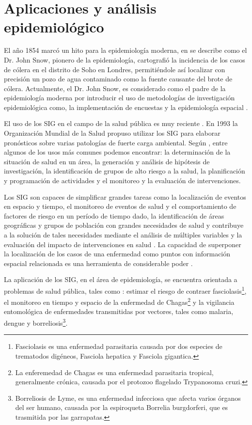 \section{Aplicaciones y análisis epidemiológico}
\label{sec:cap2-aplicaciones-analisis-epidemiologico}

El año 1854 marcó un hito para la epidemiología moderna, en \cite{jCerdaJohnSnow2007} se describe
como el Dr. John Snow, pionero de la epidemiología, cartografió la incidencia de los casos de
cólera en el distrito de Soho en Londres, permitiéndole así localizar con precisión un pozo de
agua contaminado como la fuente causante del brote de cólera. Actualmente, el Dr. John Snow, es
considerado como el padre de la epidemiología moderna por introducir el uso de  metodologías de
investigación epidemiológica como, la implementación de encuestas y la epidemiología espacial
\cite{jCerdaJohnSnow2007}.

El uso de los SIG en el campo de la salud pública es muy reciente \cite{martinez2001sigepi}. En
1993 la Organización Mundial de la Salud propuso utilizar los SIG para elaborar pronósticos
sobre varias patologías de fuerte carga ambiental\cite{curto2003aplicacion}. Según
\cite{martinez2001sigepi}, entre algunos de los usos más comunes podemos encontrar: la
determinación de la situación de salud en un área, la generación y análisis de hipótesis de
investigación, la identificación de grupos de alto riesgo a la salud, la planificación y
programación de actividades y el monitoreo y la evaluación de intervenciones.

Los SIG son capaces de simplificar grandes tareas como la localización de eventos en espacio y
tiempo, el monitoreo de eventos de salud y el comportamiento de factores de riesgo en un período
de tiempo dado, la identificación de áreas geográficas y grupos de población con grandes
necesidades de salud y contribuye a la solución de tales necesidades mediante el análisis de
múltiples variables y la evaluación del impacto de intervenciones en salud
\cite{martinez2001sigepi, iMolinaSigEpidemiologia}. La capacidad de superponer la localización de
los casos de una enfermedad como puntos con información espacial relacionada es una herramienta de
considerable poder \cite{iMolinaSigEpidemiologia}.

La aplicación de los SIG, en el área de epidemiología, se encuentra orientada a problemas de salud
pública, tales como : estimar el riesgo de contraer fasciolasis\footnote{Fasciolasis es una
enfermedad parasitaria causada por dos especies de trematodos digéneos, Fasciola hepatica y
Fasciola gigantica.}\cite{zukowski1993fasciolosis}, el monitoreo en tiempo y espacio de la
enfermedad de Chagas\footnote{La enferemedad de Chagas es una enfermedad parasitaria tropical,
generalmente crónica, causada por el protozoo flagelado Trypanosoma cruzi.}\cite{rogers1993monitoring} y la vigilancia entomológica de enfermedades transmitidas por vectores,
tales como malaria, dengue y borreliosis\footnote{Borreliosis de Lyme, es una enfermedad
infecciosa que afecta varios órganos del ser humano, causada por la espiroqueta Borrelia
burgdorferi, que es trasmitida por las garrapatas.}\cite{su1994framework, nino2008uso, albierispatial, beck1994remote, kitron1994geographic}.

